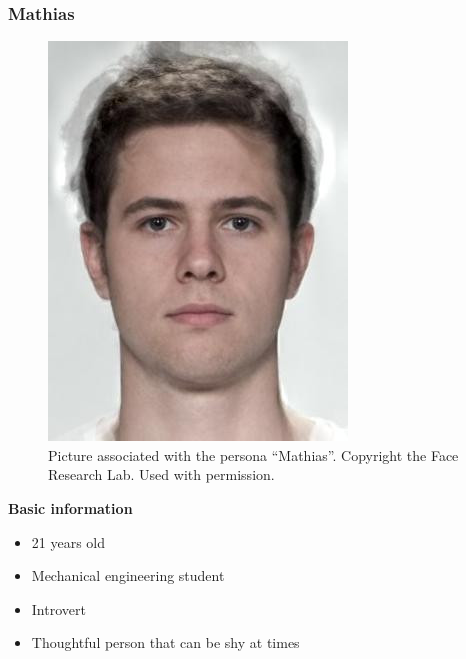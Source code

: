 \subsubsection{Mathias}
\begin{figure} [h]
  \centering
  \includegraphics[]{Images/mathias.jpg}
  \caption{Picture associated with the persona \enquote{Mathias}. Copyright the Face Research Lab. Used with permission.}
  \label{fig:mathias}
\end{figure}
\noindent\textbf{Basic information}
\begin{itemize}
\item 21 years old
\item Mechanical engineering student
\item Introvert
\item Thoughtful person that can be shy at times
\end{itemize}
